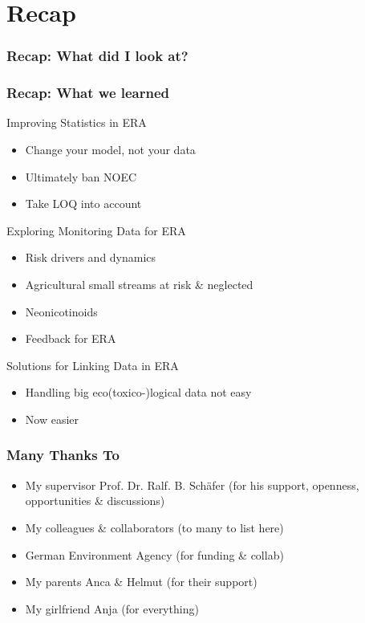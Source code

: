 \documentclass[
	10pt
	]{beamer}
\begin{document}
\section*{Recap}

\begin{frame}
\frametitle{Recap: What did I look at?}
 \resizebox{11.5cm}{!}{%
				
				}
\end{frame}


\begin{frame}
\frametitle{Recap: What we learned}
	\begin{exampleblock}{\checkmark Improving Statistics in ERA}
		\begin{itemize}
			\item Change your model, not your data
			\item Ultimately ban NOEC
			\item Take LOQ into account
		\end{itemize}
	\end{exampleblock}

\pause
	\begin{exampleblock}{\checkmark Exploring Monitoring Data for ERA}
		\begin{itemize}
			\item Risk drivers and dynamics
			\item Agricultural small streams at risk \& neglected
			\item Neonicotinoids
			\item Feedback for ERA
		\end{itemize}
	\end{exampleblock}

\pause
	\begin{exampleblock}{\checkmark Solutions for Linking Data in ERA}
		\begin{itemize}
			\item Handling big eco(toxico-)logical data not easy
			\item Now easier
		\end{itemize}
	\end{exampleblock}
\end{frame}

\begin{frame}
\frametitle{Many Thanks To}
	\begin{itemize}
		\item My supervisor \alert{Prof. Dr. Ralf. B. Schäfer} (for his support, openness, opportunities \& discussions)
		\item My \alert{colleagues \& collaborators} (to many to list here)
		\item \alert{{G}erman Environment Agency} (for funding \& collab)
		\item My parents \alert{Anca \& Helmut} (for their support)
		\item My girlfriend \alert{Anja} (for everything)
	\end{itemize}

\end{frame}
\end{document}
